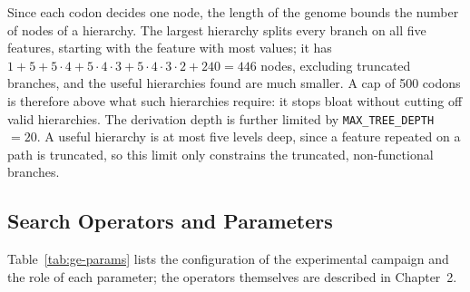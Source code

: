 Since each codon decides one node, the length of the genome bounds the number of nodes of a hierarchy.
The largest hierarchy splits every branch on all five features, starting with the feature with most values; it has $1 + 5 + 5\cdot4 + 5\cdot4\cdot3 + 5\cdot4\cdot3\cdot2 + 240 = 446$ nodes, excluding truncated branches, and the useful hierarchies found are much smaller.
A cap of 500 codons is therefore above what such hierarchies require: it stops bloat without cutting off valid hierarchies.
The derivation depth is further limited by \texttt{MAX\_TREE\_DEPTH} $= 20$.
A useful hierarchy is at most five levels deep, since a feature repeated on a path is truncated, so this limit only constrains the truncated, non-functional branches.

\subsection{Search Operators and Parameters}

Table~\ref{tab:ge-params} lists the configuration of the experimental campaign and the role of each parameter; the operators themselves are described in Chapter~2.

